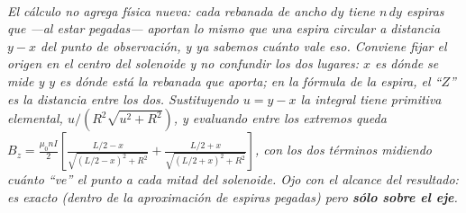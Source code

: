 \begin{center}
\\[0.5em]
{\small\itshape El cálculo no agrega física nueva: cada rebanada de ancho $dy$
tiene $n\,dy$ espiras que ---al estar pegadas--- aportan lo mismo que una espira
circular a distancia $y-x$ del punto de observación, y ya sabemos cuánto vale
eso. Conviene fijar el origen en el centro del solenoide y no confundir los dos
lugares: $x$ es dónde se mide y $y$ es dónde está la rebanada que aporta; en la
fórmula de la espira, el ``$Z$'' es la distancia entre los dos. Sustituyendo
$u = y-x$ la integral tiene primitiva elemental,
$u/(R^2\sqrt{u^2+R^2})$, y evaluando entre los extremos queda
$B_z = \frac{\mu_0 n I}{2}\left[\frac{L/2-x}{\sqrt{(L/2-x)^2+R^2}} +
\frac{L/2+x}{\sqrt{(L/2+x)^2+R^2}}\right]$, con los dos términos midiendo
cuánto ``ve'' el punto a cada mitad del solenoide. Ojo con el alcance del
resultado: es exacto (dentro de la aproximación de espiras pegadas) pero
\textbf{sólo sobre el eje}.}
\end{center}
